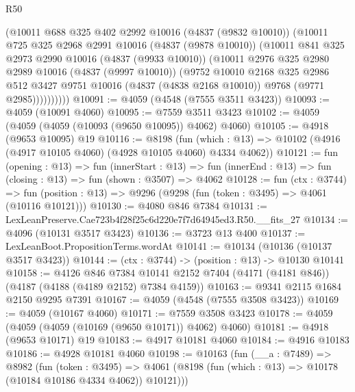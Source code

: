 \begin{lexlean}{R50}
\begin{coremodule}
            (@10011
              @688
              @325
              @402
              @2992
              @10016
              (@4837 (@9832 @10010))
              (@10011
                @725
                @325
                @2968
                @2991
                @10016
                (@4837 (@9878 @10010))
                (@10011
                  @841
                  @325
                  @2973
                  @2990
                  @10016
                  (@4837 (@9933 @10010))
                  (@10011
                    @2976
                    @325
                    @2980
                    @2989
                    @10016
                    (@4837 (@9997 @10010))
                    (@9752
                      @10010
                      @2168
                      @325
                      @2986
                      @512
                      @3427
                      @9751
                      @10016
                      (@4837 (@4838 @2168 @10010))
                      @9768
                      (@9771 @2985))))))))))
@10091 := @4059 (@4548 (@7555 @3511 @3423))
@10093 := @4059 (@10091 @4060)
@10095 := @7559 @3511 @3423
@10102 := @4059 (@4059 (@4059 (@10093 (@9650 @10095)) @4062) @4060)
@10105 := @4918 (@9653 @10095) @19
@10116 := @8198
    (fun (which : @13) => @10102 (@4916 (@4917 @10105 @4060) (@4928 @10105 @4060) @4334 @4062))
@10121 := fun (opening : @13) =>
  fun (innerStart : @13) =>
  fun (innerEnd : @13) => fun (closing : @13) => fun (shown : @3507) => @4062
@10128 := fun (ctx : @3744) =>
  fun (position : @13) => @9296 (@9298 (fun (token : @3495) => @4061 (@10116 @10121)))
@10130 := @4080 @846 @7384
@10131 := LexLeanPreserve.Cae723b4f28f25c6d220e7f7d64945ed3.R50.__fits_27
@10134 := @4096 (@10131 @3517 @3423)
@10136 := @3723 @13 @400
@10137 := LexLeanBoot.PropositionTerms.wordAt
@10141 := @10134 (@10136 (@10137 @3517 @3423))
@10144 := (ctx : @3744) -> (position : @13) -> @10130 @10141
@10158 := @4126
    @846
    @7384
    @10141
    @2152
    @7404
    (@4171 (@4181 @846))
    (@4187 (@4188 (@4189 @2152) @7384 @4159))
@10163 := @9341 @2115 @1684 @2150 @9295 @7391
@10167 := @4059 (@4548 (@7555 @3508 @3423))
@10169 := @4059 (@10167 @4060)
@10171 := @7559 @3508 @3423
@10178 := @4059 (@4059 (@4059 (@10169 (@9650 @10171)) @4062) @4060)
@10181 := @4918 (@9653 @10171) @19
@10183 := @4917 @10181 @4060
@10184 := @4916 @10183
@10186 := @4928 @10181 @4060
@10198 := @10163
    (fun (__a : @7489) =>
    @8982
      (fun (token : @3495) =>
      @4061 (@8198 (fun (which : @13) => @10178 (@10184 @10186 @4334 @4062)) @10121)))

\end{coremodule}
\end{lexlean}
